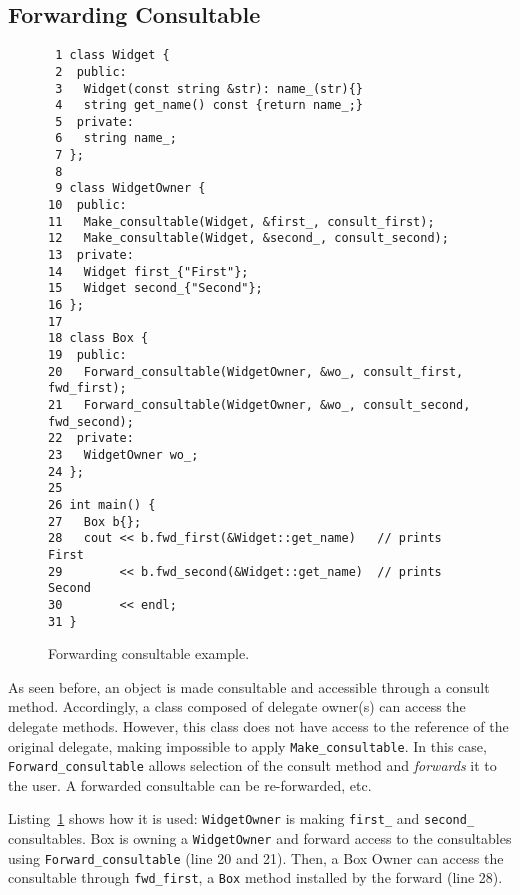 \documentclass{article}
\begin{document}
\subsection{Forwarding Consultable}

\begin{figure}[ht]
{\small
\begin{lstlisting}
 1 class Widget {
 2  public:
 3   Widget(const string &str): name_(str){}
 4   string get_name() const {return name_;}
 5  private:
 6   string name_;
 7 };
 8 
 9 class WidgetOwner {
10  public:
11   Make_consultable(Widget, &first_, consult_first);
12   Make_consultable(Widget, &second_, consult_second);
13  private:
14   Widget first_{"First"};
15   Widget second_{"Second"};
16 };
17 
18 class Box {
19  public:
20   Forward_consultable(WidgetOwner, &wo_, consult_first, fwd_first);
21   Forward_consultable(WidgetOwner, &wo_, consult_second, fwd_second);
22  private:
23   WidgetOwner wo_;
24 };
25 
26 int main() {
27   Box b{};
28   cout << b.fwd_first(&Widget::get_name)   // prints First
29        << b.fwd_second(&Widget::get_name)  // prints Second
30        << endl; 
31 }
\end{lstlisting}}
\cprotect\caption{Forwarding consultable example.}
\label{example:forward}
\end{figure}

As seen before, an object is made consultable and accessible through a consult method. Accordingly, a class composed of delegate owner(s) can access the delegate methods. However, this class does not have access to the reference of the original delegate, making impossible to apply \verb+Make_consultable+. In this case, \verb+Forward_consultable+ allows selection of the consult method and \textit{forwards} it to the user. A forwarded consultable can be re-forwarded, etc. 

Listing~\ref{example:forward} shows how it is used: \verb+WidgetOwner+ is making \verb+first_+ and \verb+second_+ consultables. Box is owning a \verb+WidgetOwner+ and forward access to the consultables using \verb+Forward_consultable+ (line 20 and 21). Then, a Box Owner can access the consultable through \verb+fwd_first+, a \verb+Box+ method installed by the forward (line 28).   
\end{document}
